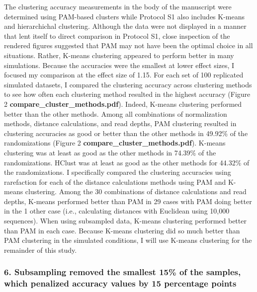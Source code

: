 \documentclass[
]{article}
\begin{document}
The clustering accuracy measurements in the body of the manuscript were
determined using PAM-based clusters while Protocol S1 also includes
K-means and hierarchichal clustering. Although the data were not
displayed in a manner that lent itself to direct comparison in Protocol
S1, close inspection of the rendered figures suggested that PAM may not
have been the optimal choice in all situations. Rather, K-means
clustering appeared to perform better in many simulations. Because the
accuracies were the smallest at lower effect sizes, I focused my
comparison at the effect size of 1.15. For each set of 100 replicated
simulated datasets, I compared the clustering accuracy across clustering
methods to see how often each clustering method resulted in the highest
accuracy (Figure 2 \textbf{compare\_cluster\_methods.pdf}). Indeed,
K-means clustering performed better than the other methods. Among all
combinations of normalization methods, distance calculations, and read
depths, PAM clustering resulted in clustering accuracies as good or
better than the other methods in 49.92\% of the randomizations (Figure 2
\textbf{compare\_cluster\_methods.pdf}). K-means clustering was at least
as good as the other methods in 74.39\% of the randomizations. HClust
was at least as good as the other methods for 44.32\% of the
randomizations. I specifically compared the clustering accuracies using
rarefaction for each of the distance calculations methods using PAM and
K-means clustering. Among the 30 combinations of distance calculations
and read depths, K-means performed better than PAM in 29 cases with PAM
doing better in the 1 other case (i.e., calculating distances with
Euclidean using 10,000 sequences). When using subsampled data, K-means
clustering performed better than PAM in each case. Because K-means
clustering did so much better than PAM clustering in the simulated
conditions, I will use K-means clustering for the remainder of this
study.

\hypertarget{subsampling-removed-the-smallest-15-of-the-samples-which-penalized-accuracy-values-by-15-percentage-points}{%
\subsubsection{6. Subsampling removed the smallest 15\% of the samples,
which penalized accuracy values by 15 percentage
points}\label{subsampling-removed-the-smallest-15-of-the-samples-which-penalized-accuracy-values-by-15-percentage-points}}
\end{document}
